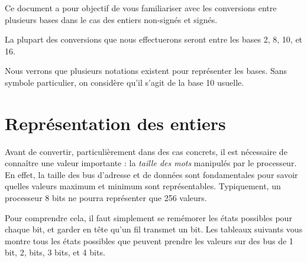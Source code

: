 \documentclass[11pt,a4paper]{article}
\begin{document}
\EncadreTitre

\bigskip


%
%

\bigskip


Ce document a pour objectif de vous familiariser avec les conversions entre plusieurs bases dans le cas des entiers non-signés et signés.

\bigskip

La plupart des conversions que nous effectuerons seront entre les bases 2, 8, 10, et 16.

\bigskip

Nous verrons que plusieurs notations existent pour représenter les bases.
Sans symbole particulier, on considère qu'il s'agit de la base 10 usuelle.

\bigskip


\section{Représentation des entiers}

\bigskip

Avant de convertir, particulièrement dans des cas concrets, il est nécessaire de connaître une valeur importante : la \textit{taille des mots} manipulés par le processeur.
En effet, la taille des bus d'adresse et de données sont fondamentales pour savoir quelles valeurs maximum et minimum sont représentables.
Typiquement, un processeur 8 bits ne pourra représenter que 256 valeurs.

Pour comprendre cela, il faut simplement se remémorer les états possibles pour chaque bit, et garder en tête qu'un fil transmet un bit.
Les tableaux suivants vous montre tous les états possibles que peuvent prendre les valeurs sur des bus de 1 bit, 2, bits, 3 bits, et 4 bits.
\end{document}
